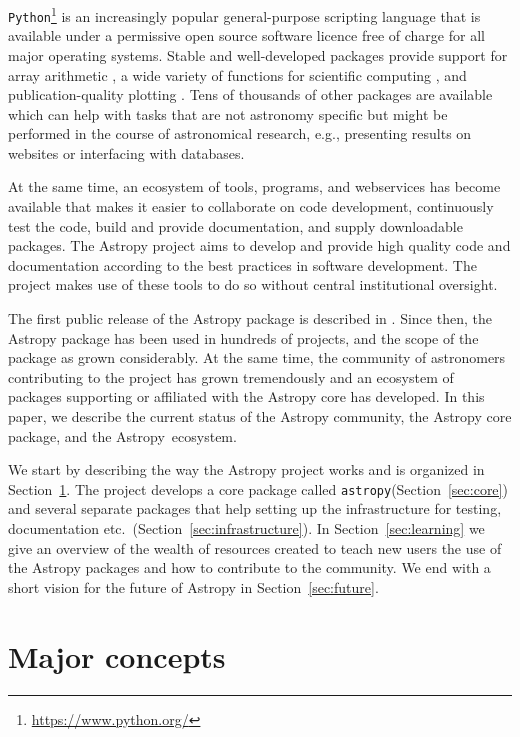 \documentclass[modern]{aastex61}
\newcommand{\package}[1]{\texttt{#1}\xspace}
\newcommand{\python}{\package{Python}\xspace}
\newcommand{\astropy}{Astropy\xspace}
\newcommand{\astropypkg}{\package{astropy}\xspace}
\newcommand{\sectionname}{Section\xspace}
\begin{document}
\python\footnote{\url{https://www.python.org/}} is an increasingly popular
general-purpose scripting language that is available under a permissive open
source software licence free of charge for all major operating systems. Stable
and well-developed packages provide support for array arithmetic
\citep[\package{numpy},][]{numpy}, a wide variety of functions for scientific
computing \citep[\package{scipy},][]{numpy}, and publication-quality plotting
\citep[\package{matplotlib},][]{matplotlib}. Tens of thousands of other packages
are available which can help with tasks that are not astronomy specific but
might be performed in the course of astronomical research, e.g., presenting
results on websites or interfacing with databases.

At the same time, an ecosystem of tools, programs, and webservices
has become available that makes it easier to collaborate on code development,
continuously test the code, build and provide documentation, and
supply downloadable packages. The \astropy project aims to develop and
provide high quality code and documentation according to the best
practices in software development. The project makes use of these
tools to do so without central institutional oversight.

The first public release of the \astropy package is described in
\cite{astropy}. Since then, the \astropy package has been
used in hundreds of projects, and the scope of the package as grown
considerably. At the same time, the community of astronomers
contributing to the project has grown tremendously and an ecosystem
of packages supporting or affiliated with the \astropy core has
developed. In this paper, we describe the current status of the
\astropy community, the \astropy core package, and the \astropy\
ecosystem.

We start by describing the way the \astropy project works and is
organized in \sectionname~\ref{sec:concepts}.  The project develops a core
package called \astropypkg (\sectionname~\ref{sec:core}) and several
separate packages that help setting up the infrastructure for testing,
documentation etc.~(\sectionname~\ref{sec:infrastructure}). In
\sectionname~\ref{sec:learning} we give an overview of the wealth of
resources created to teach new users the use of the \astropy packages
and how to contribute to the community. We end with a short vision for
the future of \astropy in \sectionname~\ref{sec:future}.



\section{Major concepts}
\label{sec:concepts}
\end{document}
